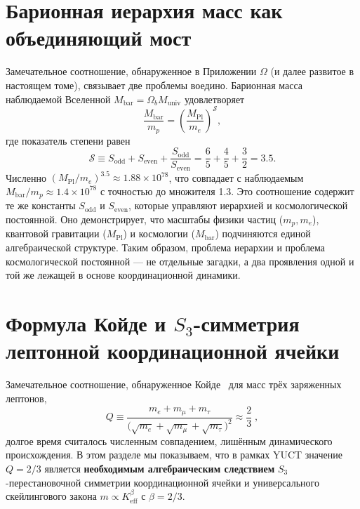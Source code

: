\documentclass[11pt,a4paper]{article}
\theoremstyle{remark}
\begin{document}
	\section{Барионная иерархия масс как объединяющий мост}
	
	Замечательное соотношение, обнаруженное в Приложении $\Omega$ (и далее развитое в настоящем томе), связывает две проблемы воедино. Барионная масса наблюдаемой Вселенной \(M_{\mathrm{bar}} = \Omega_b M_{\mathrm{univ}}\) удовлетворяет
	\begin{equation}
		\frac{M_{\mathrm{bar}}}{m_p} = \left( \frac{M_{\mathrm{Pl}}}{m_e} \right)^{\mathcal{S}},
		\label{eq:baryon-hierarchy}
	\end{equation}
	где показатель степени равен
	\begin{equation}
		\mathcal{S} \equiv S_{\mathrm{odd}} + S_{\mathrm{even}} + \frac{S_{\mathrm{odd}}}{S_{\mathrm{even}}} = \frac{6}{5} + \frac{4}{5} + \frac{3}{2} = 3.5.
	\end{equation}
	Численно \((M_{\mathrm{Pl}}/m_e)^{3.5} \approx 1.88 \times 10^{78}\), что совпадает с наблюдаемым \(M_{\mathrm{bar}}/m_p \approx 1.4 \times 10^{78}\) с точностью до множителя 1.3. Это соотношение содержит те же константы \(S_{\mathrm{odd}}\) и \(S_{\mathrm{even}}\), которые управляют иерархией и космологической постоянной. Оно демонстрирует, что масштабы физики частиц (\(m_p, m_e\)), квантовой гравитации (\(M_{\mathrm{Pl}}\)) и космологии (\(M_{\mathrm{bar}}\)) подчиняются единой алгебраической структуре. Таким образом, проблема иерархии и проблема космологической постоянной — не отдельные загадки, а два проявления одной и той же лежащей в основе координационной динамики.
	
	\section{Формула Койде и \(S_3\)-симметрия лептонной координационной ячейки}
	\label{sec:koide}
	
	Замечательное соотношение, обнаруженное Койде~\cite{Koide1983} для масс трёх заряженных лептонов,
	\begin{equation}
		Q \equiv \frac{m_e + m_\mu + m_\tau}{\bigl(\sqrt{m_e} + \sqrt{m_\mu} + \sqrt{m_\tau}\bigr)^2}
		\approx \frac{2}{3}\;,
	\end{equation}
	долгое время считалось численным совпадением, лишённым динамического происхождения. В этом разделе мы показываем, что в рамках YUCT значение \(Q=2/3\) является \textbf{необходимым алгебраическим следствием} \(S_3\)-перестановочной симметрии координационной ячейки и универсального скейлингового закона \(m \propto K_{\mathrm{eff}}^{\beta}\) с \(\beta=2/3\).
	
\end{document}
